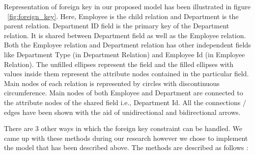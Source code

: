 \documentclass[12pt, oneside]{book}
\begin{document}
Representation of foreign key in our proposed model has been illustrated in figure ~\ref{fig:foreign_key}. Here, Employee is the child relation and Department is the parent relation. Department ID field is the primary key of the Department relation. It is shared between Department field as well as the Employee relation. Both the Employee relation and Department relation has other independent fields like Department Type (in Department Relation) and Employee Id (in Employee Relation). The unfilled ellipses represent the field and the filled ellipses with values inside them represent the attribute nodes contained in the particular field. Main nodes of each relation is represented by circles with discontinuous circumference. Main nodes of both Employee and Department are connected to the attribute nodes of the shared field i.e., Department Id. All the connections / edges have been shown with the aid of unidirectional and bidirectional arrows. \\ \par
There are 3 other ways in which the foreign key constraint can be handled. We came up with these methods during our research however we chose to implement the model that has been described above. The methods are described as follows :
\end{document}

